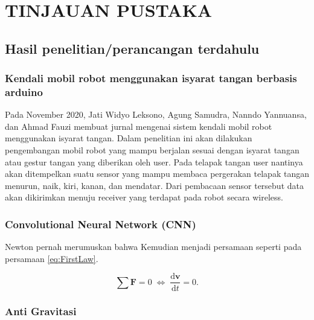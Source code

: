 \section{TINJAUAN PUSTAKA}

\subsection{Hasil penelitian/perancangan terdahulu}
\subsubsection{Kendali mobil robot menggunakan isyarat tangan berbasis arduino}
Pada November 2020, Jati Widyo Leksono, Agung Samudra, Nanndo Yannuansa, dan Ahmad Fauzi membuat jurnal mengenai sistem kendali mobil robot menggunakan isyarat tangan. Dalam penelitian ini akan dilakukan pengembangan mobil robot yang mampu berjalan sesuai dengan isyarat tangan atau gestur tangan yang diberikan oleh user. Pada telapak tangan user nantinya akan ditempelkan suatu sensor yang mampu membaca pergerakan telapak tangan menurun, naik, kiri, kanan, dan mendatar. Dari pembacaan sensor tersebut data akan dikirimkan menuju receiver yang terdapat pada robot secara wireless. \parencite{JurnalElectroLuecat}

\subsubsection{}

\subsubsection{Convolutional Neural Network (CNN)}


Newton pernah merumuskan \parencite{Newton1687} bahwa \lipsum[8]
Kemudian menjadi persamaan seperti pada persamaan \ref{eq:FirstLaw}.

\begin{equation}
  \label{eq:FirstLaw}
  \sum \mathbf{F} = 0\; \Leftrightarrow\; \frac{\mathrm{d} \mathbf{v} }{\mathrm{d}t} = 0.
\end{equation}

\lipsum[9]

\subsubsection{Anti Gravitasi}

\lipsum[10]
